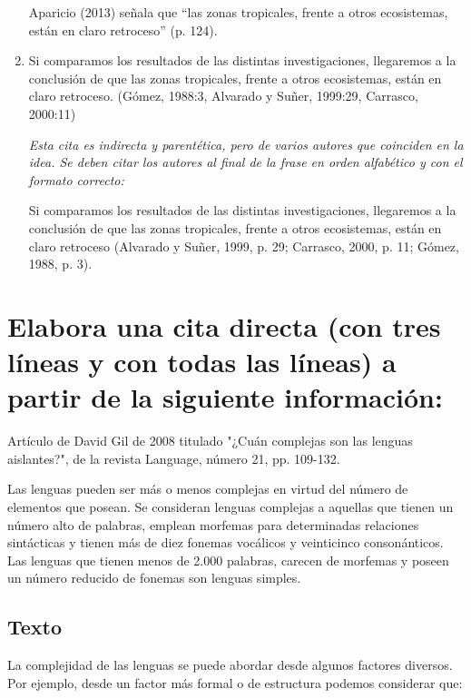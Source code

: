 \documentclass[12pt, a4paper, oneside]{report}
\begin{document}
\begin{Large}
\begin{enumerate}
                    Aparicio (2013) señala que ``las zonas tropicales, frente a otros ecosistemas, están en
                    claro retroceso'' (p. 124).
                    \clearpage
                    \item Si comparamos los resultados de las distintas investigaciones, llegaremos a la
                    conclusión de que las zonas tropicales, frente a otros ecosistemas, están en claro retroceso.
                    (Gómez, 1988:3, Alvarado y Suñer, 1999:29, Carrasco, 2000:11)

                    \textit{Esta cita es indirecta y parentética, pero de varios autores que coinciden en la idea.
                    Se deben citar los autores al final de la frase en orden alfabético y con el formato
                    correcto:}

                    Si comparamos los resultados de las distintas investigaciones, llegaremos a la conclusión de
                    que las zonas tropicales, frente a otros ecosistemas, están en claro retroceso
                    (Alvarado y Suñer, 1999, p. 29; Carrasco, 2000, p. 11; Gómez, 1988, p. 3).
                \end{enumerate}
            \end{Large}
            \clearpage

        \section{Elabora una cita directa (con tres líneas y con todas las líneas) a partir de la siguiente
        información:}

            Artículo de David Gil de 2008 titulado "¿Cuán complejas son las lenguas aislantes?", de la revista
            Language, número 21, pp. 109-132.

            Las lenguas pueden ser más o menos complejas en virtud del número de elementos que posean. Se
            consideran lenguas complejas a aquellas que tienen un número alto de palabras, emplean morfemas
            para determinadas relaciones sintácticas y tienen más de diez fonemas vocálicos y veinticinco
            consonánticos. Las lenguas que tienen menos de 2.000 palabras, carecen de morfemas y poseen un
            número reducido de fonemas son lenguas simples.

            \subsection*{Texto}
                La complejidad de las lenguas se puede abordar desde algunos factores diversos. Por ejemplo,
                desde un factor más formal o de estructura podemos considerar que:
\end{document}
